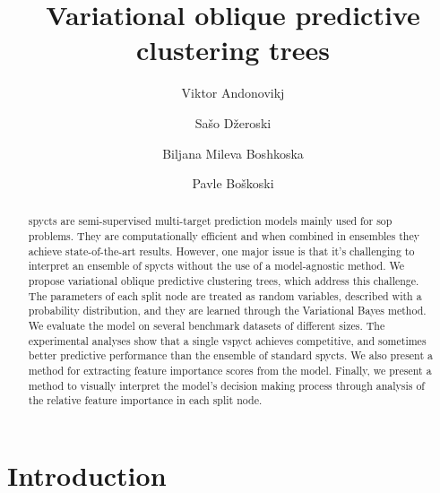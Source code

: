 \documentclass[3p,review,authoryear]{elsarticle}
\begin{document}
\begin{frontmatter}
	\title{Variational oblique predictive clustering trees}
	\author[1,2]{Viktor Andonovikj}
	\author[1]{Sašo Džeroski}
	\author[1,3]{Biljana Mileva Boshkoska}
	\author[1]{Pavle Boškoski}
	\address[1]{Jožef Stefan Institute, Jamova cesta 39, 1000 Ljubljana, Slovenia}
	\address[2]{Jožef Stefan International Postgraduate School, Jamova cesta 39, 1000 Ljubljana, Slovenia}
	\address[3]{Faculty of Information Studies in Novo mesto, Ljubljanska cesta 31b, 8000 Novo mesto, Slovenia}
\begin{abstract}

\Glspl{spyct} are semi-supervised multi-target prediction models mainly used for \gls{sop} problems.
They are computationally efficient and when combined in ensembles they achieve state-of-the-art results.
However, one major issue is that it's challenging to interpret an ensemble of \glspl{spyct} without the use of a model-agnostic method.
We propose variational oblique predictive clustering trees, which address this challenge.
The parameters of each split node are treated as random variables, described with a probability distribution, and they are learned through the Variational Bayes method.
We evaluate the model on several benchmark datasets of different sizes.
The experimental analyses show that a single \gls{vspyct} achieves competitive, and sometimes better predictive performance than the ensemble of standard \glspl{spyct}.
We also present a method for extracting feature importance scores from the model.
Finally, we present a method to visually interpret the model's decision making process through analysis of the relative feature importance in each split node.
\end{abstract}
\end{frontmatter}
\glsresetall

\section{Introduction}
\end{document}
